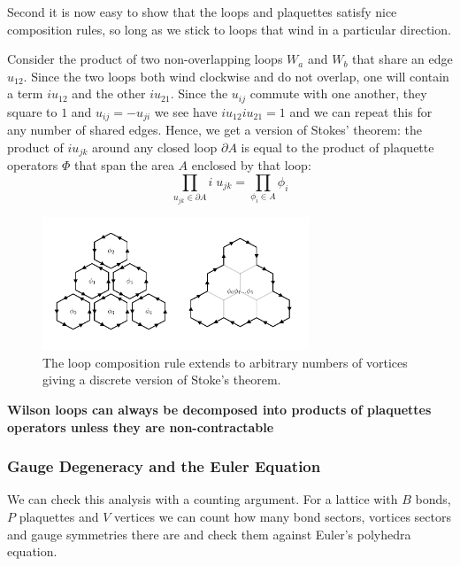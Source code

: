 Second it is now easy to show that the loops and plaquettes satisfy nice composition rules, so long as we stick to loops that wind in a particular direction.

Consider the product of two non-overlapping loops \(W_a\) and \(W_b\) that share an edge \(u_{12}\). Since the two loops both wind clockwise and do not overlap, one will contain a term \(i u_{12}\) and the other \(i u_{21}\). Since the \(u_{ij}\) commute with one another, they square to \(1\) and \(u_{ij} = -u_{ji}\) we see have \(i u_{12} i u_{21} = 1\) and we can repeat this for any number of shared edges. Hence, we get a version of Stokes' theorem: the product of \(i u_{jk}\) around any closed loop \(\partial A\) is equal to the product of plaquette operators \(\Phi\) that span the area \(A\) enclosed by that loop: \[\prod_{u_{jk} \in \partial A} i \; u_{jk} = \prod_{\phi_i \in A} \phi_i\]

\begin{figure}
\hypertarget{fig:stokes_theorem}{%
\centering
\includegraphics[width=0.71\textwidth,height=\textheight]{figure_code/amk_chapter/stokes_theorem/stokes_theorem.pdf}
\caption{The loop composition rule extends to arbitrary numbers of vortices giving a discrete version of Stoke's theorem.}\label{fig:stokes_theorem}
}
\end{figure}

\textbf{Wilson loops can always be decomposed into products of plaquettes operators unless they are non-contractable}

\hypertarget{gauge-degeneracy-and-the-euler-equation}{%
\subsubsection{Gauge Degeneracy and the Euler Equation}\label{gauge-degeneracy-and-the-euler-equation}}

We can check this analysis with a counting argument. For a lattice with \(B\) bonds, \(P\) plaquettes and \(V\) vertices we can count how many bond sectors, vortices sectors and gauge symmetries there are and check them against Euler's polyhedra equation.

